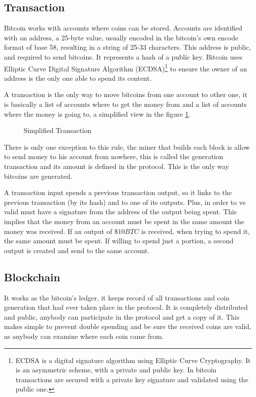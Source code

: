   \subsection{Transaction}\label{subsec:Transaction}
Bitcoin works with accounts where coins can be stored. Accounts are identified
  with an address, a 25-byte value, usually encoded in the bitcoin's own encode
  format of base 58, resulting in a string of 25-33 characters.
This address is public, and required to send bitcoins. It represents a hash of
  a public key. Bitcoin uses Elliptic Curve Digital Signature Algorithm
  (ECDSA)\footnote{ECDSA is a digital signature algorithm using Elliptic Curve
  Cryptography. It is an asymmetric scheme, with a private and public key. In
  bitcoin transactions are secured with a private key signature and validated
  using the public one.} to ensure the owner of an address is the only one able
  to spend its content.

A transaction is the only way to move bitcoins from one account to other one,
  it is basically a list of accounts where to get the money from and a list
  of accounts where the money is going to, a simplified view in the figure
  \ref{fig:simplified_transaction}.

\begin{figure}
	\centering
	
	\caption{Simplified Transaction}
	\label{fig:simplified_transaction}
\end{figure}

There is only one exception to this rule, the miner that builds each block is
  allow to send money to his account from nowhere, this is called the generation
  transaction and its amount is defined in the protocol.
This is the only way bitcoins are generated.

A transaction input spends a previous transaction output, so it links to the
  previous transaction (by its hash) and to one of its outputs. Plus, in order
  to ve valid must have a signature from the address of the output being spent.
This implies that the money from an account must be spent in the same amount
  the money was received. If an output of $\$ 10BTC$ is received, when trying
  to spend it, the same amount must be spent. If willing to spend just a
  portion, a second output is created and send to the same account.

  \subsection{Blockchain} \label{subsec:Blockchain}
It works as the bitcoin's ledger, it keeps record of all
  transactions and coin generation that had ever taken place in the protocol.
It is completely distributed and public, anybody can participate in the
  protocol and get a copy of it. This makes simple to prevent double spending
  and be sure the received coins are valid, as anybody can examine where each
  coin came from.

